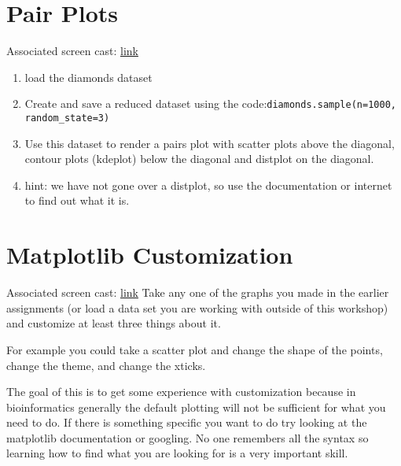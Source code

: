 \documentclass{article}
\begin{document}
\section{Pair Plots}
Associated screen cast: \href{https://www.youtube.com/watch?v=_buOJaXsm0Q}{link}
\begin{enumerate}
		\item load the diamonds dataset 
		\item Create and save a reduced dataset using the code:\texttt{diamonds.sample(n=1000, random\_state=3)}
		\item Use this dataset to render a pairs plot with scatter plots above the diagonal, contour plots (kdeplot) below the diagonal and distplot on the diagonal.
		\item hint: we have not gone over a distplot, so use the documentation or internet to find out what it is.
\end{enumerate}
\section{Matplotlib Customization}
Associated screen cast: \href{https://www.youtube.com/watch?v=NDFtHuB-New}{link}
Take any one of the graphs you made in the earlier assignments (or load a data set you are working with outside of this workshop)  and customize at least three things about it.

For example you could take a scatter plot and change the shape of the points, change the theme, and change the xticks.

The goal of this is to get some experience with customization because in bioinformatics generally the default plotting will not be sufficient for what you need to do. If there is something specific you want to do try looking at the matplotlib documentation or googling. No one remembers all the syntax so learning how to find what you are looking for is a very important skill.
\end{document}

